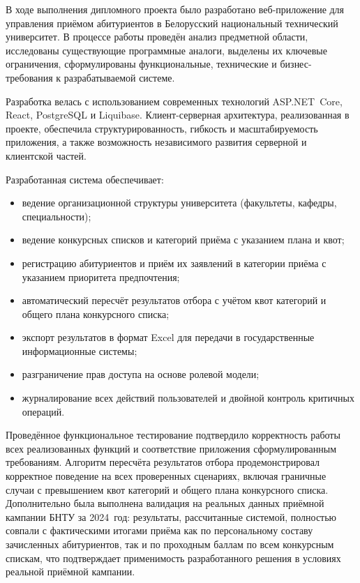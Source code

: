 
В ходе выполнения дипломного проекта было разработано веб-приложение для управления приёмом абитуриентов в Белорусский национальный технический университет.
В процессе работы проведён анализ предметной области, исследованы существующие программные аналоги, выделены их ключевые ограничения, сформулированы функциональные, технические и бизнес-требования к разрабатываемой системе.

Разработка велась с использованием современных технологий ASP.NET~Core, React, PostgreSQL и Liquibase.
Клиент-серверная архитектура, реализованная в проекте, обеспечила структурированность, гибкость и масштабируемость приложения, а также возможность независимого развития серверной и клиентской частей.

Разработанная система обеспечивает:
\begin{itemize}
\item ведение организационной структуры университета (факультеты, кафедры, специальности);
\item ведение конкурсных списков и категорий приёма с указанием плана и квот;
\item регистрацию абитуриентов и приём их заявлений в категории приёма с указанием приоритета предпочтения;
\item автоматический пересчёт результатов отбора с учётом квот категорий и общего плана конкурсного списка;
\item экспорт результатов в формат Excel для передачи в государственные информационные системы;
\item разграничение прав доступа на основе ролевой модели;
\item журналирование всех действий пользователей и двойной контроль критичных операций.
\end{itemize}

Проведённое функциональное тестирование подтвердило корректность работы всех реализованных функций и соответствие приложения сформулированным требованиям.
Алгоритм пересчёта результатов отбора продемонстрировал корректное поведение на всех проверенных сценариях, включая граничные случаи с превышением квот категорий и общего плана конкурсного списка.
Дополнительно была выполнена валидация на реальных данных приёмной кампании БНТУ за 2024~год: результаты, рассчитанные системой, полностью совпали с фактическими итогами приёма как по персональному составу зачисленных абитуриентов, так и по проходным баллам по всем конкурсным спискам, что подтверждает применимость разработанного решения в условиях реальной приёмной кампании.

